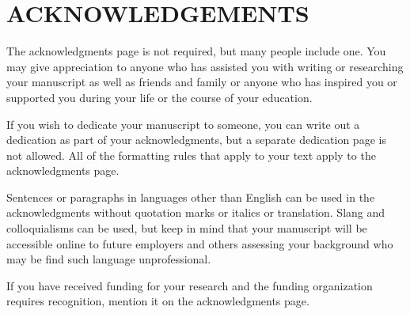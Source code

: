 \part{ACKNOWLEDGEMENTS}
\doublespacing

The acknowledgments page is not required, but many people include one. You may give appreciation to anyone who has assisted you with writing or researching your manuscript as well as friends and family or anyone who has inspired you or supported you during your life or the course of your education.

If you wish to dedicate your manuscript to someone, you can write out a dedication as part of your acknowledgments, but a separate dedication page is not allowed. All of the formatting rules that apply to your text apply to the acknowledgments page.

Sentences or paragraphs in languages other than English can be used in the acknowledgments without quotation marks or italics or translation. Slang and colloquialisms can be used, but keep in mind that your manuscript will be accessible online to future employers and others assessing your background who may be find such language unprofessional.

If you have received funding for your research and the funding organization requires recognition, mention it on the acknowledgments page.